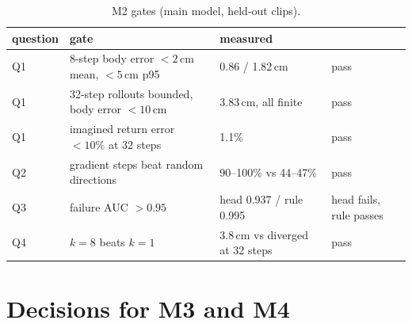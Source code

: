 \documentclass[10pt]{article}
\begin{document}
\begin{table}[H]
\centering\small
\caption{M2 gates (main model, held-out clips).}
\label{tab:gates}
\begin{tabular}{llll}\toprule
question & gate & measured & \\\midrule
Q1 & 8-step body error $< 2$\,cm mean, $< 5$\,cm p95 & 0.86 / 1.82\,cm & pass \\
Q1 & 32-step rollouts bounded, body error $< 10$\,cm & 3.83\,cm, all finite & pass \\
Q1 & imagined return error $< 10\%$ at 32 steps & 1.1\% & pass \\
Q2 & gradient steps beat random directions & 90--100\% vs 44--47\% & pass \\
Q3 & failure AUC $> 0.95$ & head 0.937 / rule 0.995 & head fails, rule passes \\
Q4 & $k{=}8$ beats $k{=}1$ & 3.8\,cm vs diverged at 32 steps & pass \\\bottomrule
\end{tabular}
\end{table}

\section{Decisions for M3 and M4}
\end{document}
